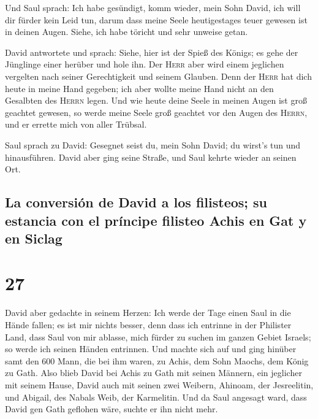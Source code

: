  Und Saul sprach: Ich habe gesündigt, komm wieder, mein
Sohn David, ich will dir fürder kein Leid tun, darum dass meine Seele
heutigestages teuer gewesen ist in deinen Augen. Siehe, ich habe töricht
und sehr unweise getan.

 David antwortete und sprach: Siehe, hier ist der Spieß
des Königs; es gehe der Jünglinge einer herüber und hole ihn.
 Der \textsc{Herr} aber wird einem jeglichen vergelten
nach seiner Gerechtigkeit und seinem Glauben. Denn der \textsc{Herr} hat
dich heute in meine Hand gegeben; ich aber wollte meine Hand nicht an
den Gesalbten des \textsc{Herrn} legen.  Und wie heute
deine Seele in meinen Augen ist groß geachtet gewesen, so werde meine
Seele groß geachtet vor den Augen des \textsc{Herrn}, und er errette
mich von aller Trübsal.

 Saul sprach zu David: Gesegnet seist du, mein Sohn
David; du wirst's tun und hinausführen. David aber ging seine Straße,
und Saul kehrte wieder an seinen Ort.

\hypertarget{la-conversiuxf3n-de-david-a-los-filisteos-su-estancia-con-el-pruxedncipe-filisteo-achis-en-gat-y-en-siclag}{%
\subsection{La conversión de David a los filisteos; su estancia con el
príncipe filisteo Achis en Gat y en
Siclag}\label{la-conversiuxf3n-de-david-a-los-filisteos-su-estancia-con-el-pruxedncipe-filisteo-achis-en-gat-y-en-siclag}}

\hypertarget{section-26}{%
\section{27}\label{section-26}}

 David aber gedachte in seinem Herzen: Ich werde der Tage
einen Saul in die Hände fallen; es ist mir nichts besser, denn dass ich
entrinne in der Philister Land, dass Saul von mir ablasse, mich fürder
zu suchen im ganzen Gebiet Israels; so werde ich seinen Händen
entrinnen.  Und machte sich auf und ging hinüber samt den
600 Mann, die bei ihm waren, zu Achis, dem Sohn Maochs, dem König zu
Gath.  Also blieb David bei Achis zu Gath mit seinen
Männern, ein jeglicher mit seinem Hause, David auch mit seinen zwei
Weibern, Ahinoam, der Jesreelitin, und Abigail, des Nabals Weib, der
Karmelitin.  Und da Saul angesagt ward, dass David gen
Gath geflohen wäre, suchte er ihn nicht mehr.

